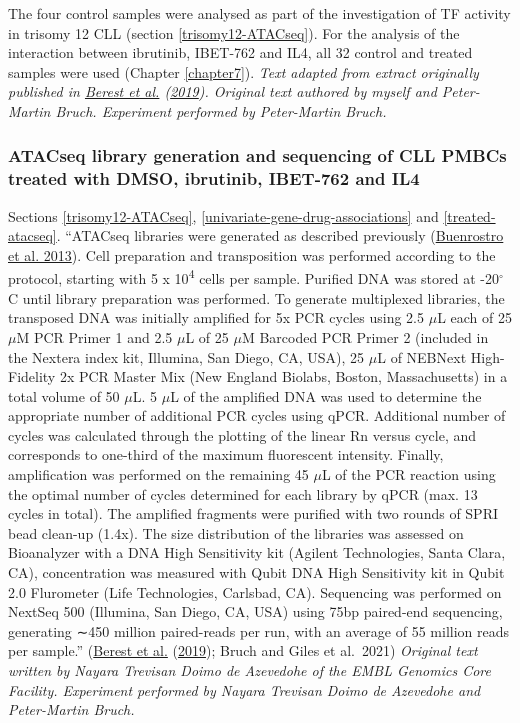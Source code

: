 \documentclass[11pt, a4paper, twosided]{book}
\begin{document}
The four control samples were analysed as part of the investigation of TF activity in trisomy 12 CLL (section \ref{trisomy12-ATACseq}). For the analysis of the interaction between ibrutinib, IBET-762 and IL4, all 32 control and treated samples were used (Chapter \ref{chapter7}). \emph{Text adapted from extract originally published in \protect\hyperlink{ref-Berest2019}{Berest et al.} (\protect\hyperlink{ref-Berest2019}{2019}). Original text authored by myself and Peter-Martin Bruch. Experiment performed by Peter-Martin Bruch.}

\hypertarget{treated-ATACseq-method}{%
\subsubsection{ATACseq library generation and sequencing of CLL PMBCs treated with DMSO, ibrutinib, IBET-762 and IL4}\label{treated-ATACseq-method}}

Sections \ref{trisomy12-ATACseq}, \ref{univariate-gene-drug-associations} and \ref{treated-atacseq}. ``ATACseq libraries were generated as described previously (\protect\hyperlink{ref-Buenrostro2013}{Buenrostro et al. 2013}). Cell preparation and transposition was performed according to the protocol, starting with 5 x 10\textsuperscript{4} cells per sample. Purified DNA was stored at -20\(^\circ\)C until library preparation was performed. To generate multiplexed libraries, the transposed DNA was initially amplified for 5x PCR cycles using 2.5 \(\mu\)L each of 25 \(\mu\)M PCR Primer 1 and 2.5 \(\mu\)L of 25 \(\mu\)M Barcoded PCR Primer 2 (included in the Nextera index kit, Illumina, San Diego, CA, USA), 25 \(\mu\)L of NEBNext High-Fidelity 2x PCR Master Mix (New England Biolabs, Boston, Massachusetts) in a total volume of 50 \(\mu\)L. 5 \(\mu\)L of the amplified DNA was used to determine the appropriate number of additional PCR cycles using qPCR. Additional number of cycles was calculated through the plotting of the linear Rn versus cycle, and corresponds to one-third of the maximum fluorescent intensity. Finally, amplification was performed on the remaining 45 \(\mu\)L of the PCR reaction using the optimal number of cycles determined for each library by qPCR (max. 13 cycles in total). The amplified fragments were purified with two rounds of SPRI bead clean-up (1.4x). The size distribution of the libraries was assessed on Bioanalyzer with a DNA High Sensitivity kit (Agilent Technologies, Santa Clara, CA), concentration was measured with Qubit DNA High Sensitivity kit in Qubit 2.0 Flurometer (Life Technologies, Carlsbad, CA). Sequencing was performed on NextSeq 500 (Illumina, San Diego, CA, USA) using 75bp paired-end sequencing, generating ∼450 million paired-reads per run, with an average of 55 million reads per sample.'' (\protect\hyperlink{ref-Berest2019}{Berest et al.} (\protect\hyperlink{ref-Berest2019}{2019}); Bruch and Giles et al.~2021) \emph{Original text written by Nayara Trevisan Doimo de Azevedohe of the EMBL Genomics Core Facility. Experiment performed by Nayara Trevisan Doimo de Azevedohe and Peter-Martin Bruch.}
\end{document}
